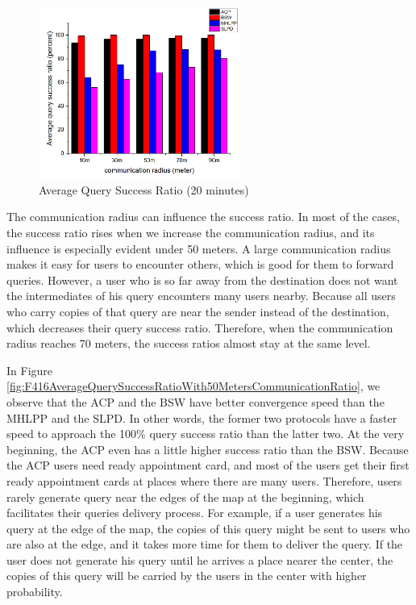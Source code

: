 \documentclass[conference]{IEEEtran}
\begin{document}
\begin{figure} [H]
  \centering 
  \includegraphics[width=2.6in]{figures/F415AverageQuerySuccessRatio20minutes.png}
  \caption{Average Query Success Ratio (20 minutes)} 
  \label{fig:AverageQuerySuccessRatio20} %
\end{figure}

The communication radius can influence the success ratio. In most of the cases, the success ratio rises when we increase the communication radius, and its influence is especially evident under 50 meters. A large communication radius makes it easy for users to encounter others, which is good for them to forward queries. However, a user who is so far away from the destination does not want the intermediates of his query encounters many users nearby. Because all users who carry copies of that query are near the sender instead of the destination, which decreases their query success ratio. Therefore, when the communication radius reaches 70 meters, the success ratios almost stay at the same level.

In Figure \ref{fig:F416AverageQuerySuccessRatioWith50MetersCommunicationRatio}, we observe that the ACP and the BSW have better convergence speed than the MHLPP and the SLPD. In other words, the former two protocols have a faster speed to approach the 100\% query success ratio than the latter two. At the very beginning, the ACP even has a little higher success ratio than the BSW. Because the ACP users need ready appointment card, and most of the users get their first ready appointment cards at places where there are many users. Therefore, users rarely generate query near the edges of the map at the beginning, which facilitates their queries delivery process. For example, if a user generates his query at the edge of the map, the copies of this query might be sent to users who are also at the edge, and it takes more time for them to deliver the query. If the user does not generate his query until he arrives a place nearer the center, the copies of this query will be carried by the users in the center with higher probability.
\end{document}
